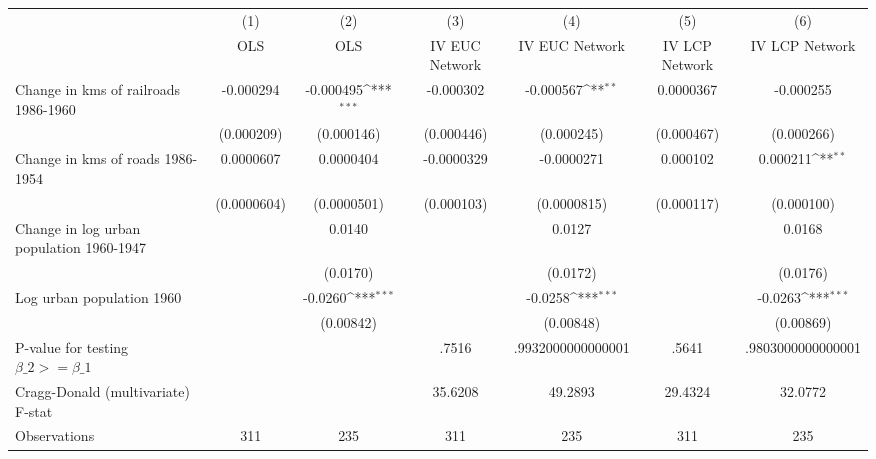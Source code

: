 {
\def\sym#1{\ifmmode^{#1}\else\(^{#1}\)\fi}
\begin{tabular}{l*{6}{c}}
\hline\hline
                &\multicolumn{1}{c}{(1)}&\multicolumn{1}{c}{(2)}&\multicolumn{1}{c}{(3)}&\multicolumn{1}{c}{(4)}&\multicolumn{1}{c}{(5)}&\multicolumn{1}{c}{(6)}\\
                &\multicolumn{1}{c}{OLS}&\multicolumn{1}{c}{OLS}&\multicolumn{1}{c}{IV EUC Network}&\multicolumn{1}{c}{IV EUC Network}&\multicolumn{1}{c}{IV LCP Network}&\multicolumn{1}{c}{IV LCP Network}\\
\hline
Change in kms of railroads 1986-1960&-0.000294         &-0.000495\sym{***}&-0.000302         &-0.000567\sym{**} &0.0000367         &-0.000255         \\
                &(0.000209)         &(0.000146)         &(0.000446)         &(0.000245)         &(0.000467)         &(0.000266)         \\
[1em]
Change in kms of roads 1986-1954&0.0000607         &0.0000404         &-0.0000329         &-0.0000271         & 0.000102         & 0.000211\sym{**} \\
                &(0.0000604)         &(0.0000501)         &(0.000103)         &(0.0000815)         &(0.000117)         &(0.000100)         \\
[1em]
Change in log urban population 1960-1947&                  &   0.0140         &                  &   0.0127         &                  &   0.0168         \\
                &                  & (0.0170)         &                  & (0.0172)         &                  & (0.0176)         \\
[1em]
Log urban population 1960&                  &  -0.0260\sym{***}&                  &  -0.0258\sym{***}&                  &  -0.0263\sym{***}\\
                &                  &(0.00842)         &                  &(0.00848)         &                  &(0.00869)         \\
\hline
P-value for testing $\beta\_{2} >= \beta\_{1}$&                  &                  &    .7516         &.9932000000000001         &    .5641         &.9803000000000001         \\
Cragg-Donald (multivariate) F-stat&                  &                  &  35.6208         &  49.2893         &  29.4324         &  32.0772         \\
Observations    &      311         &      235         &      311         &      235         &      311         &      235         \\
\hline\hline
\end{tabular}
}
